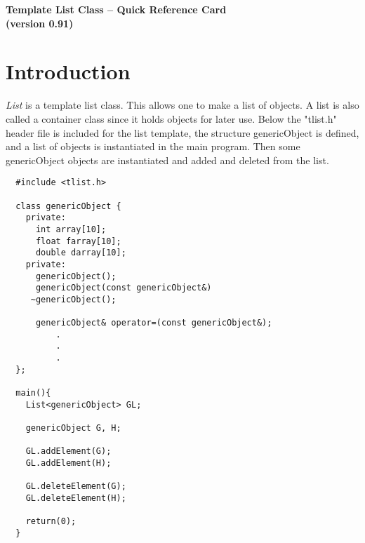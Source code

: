 %
\oddsidemargin   0.40in
\evensidemargin  0.40in
\leftmargin  0.0in
\rightmargin 0.0in
\textwidth   5.32in              %
\topmargin   0.30in              %
\headheight  0.1in               %
\headsep     0.1in               %
\textheight  8.0in               %
\topskip     0.0in               %
\footheight  0.1in               %
\footskip    0.3in               %
%

%
%
%

\begin{center}
   {\Large {\bf Template List Class -- Quick Reference Card } } \\
                    {\bf (version 0.91) }\\
\end{center}

\section{Introduction}
{\em List} is a template list class.  This allows one to make a list of objects.  A list is also called a container class since it holds objects for later use.  Below the "tlist.h" header file is included for the list template, the structure genericObject is defined,  and a list of objects is instantiated in the main program.  Then some genericObject objects are instantiated and added and deleted from the list.

\begin{verbatim}
  #include <tlist.h>
	
  class genericObject {
    private:
      int array[10];
      float farray[10];
      double darray[10];
    private:
      genericObject();
      genericObject(const genericObject&)
     ~genericObject();

      genericObject& operator=(const genericObject&);
	      .
	      .
	      .
  };
	
  main(){
    List<genericObject> GL;

    genericObject G, H;

    GL.addElement(G);
    GL.addElement(H);
	   
    GL.deleteElement(G);
    GL.deleteElement(H);
	   
    return(0);
  }
	
\end{verbatim}

